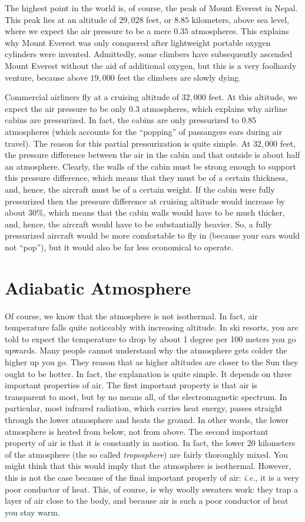The highest point in the world is, of course, the peak of
Mount Everest in Nepal. This peak lies at
an altitude of $29,028$ feet, or $8.85$ kilometers, above sea level,
where we expect the air pressure to
be a mere  $0.35$ atmospheres. This explains why Mount Everest was only conquered
after lightweight portable oxygen cylinders were  invented. Admittedly, 
some climbers have subsequently ascended Mount Everest without the aid of 
additional oxygen, 
but this is a very foolhardy venture, because 
 above $19,000$ feet the climbers are slowly dying.

Commercial airliners fly at a cruising altitude of $32,000$ feet. At
this altitude, we expect the air pressure to be only $0.3$ atmospheres,
which explains
why airline cabins are pressurized. In fact, the cabins are only pressurized to
$0.85$ atmospheres (which  accounts for the ``popping'' of passangers
ears during
air travel). The reason for this partial pressurization is quite simple. At 
$32,000$ feet, the pressure difference between the air in the cabin and that
outside  is
about half an atmosphere. Clearly, the walls of the cabin  must be strong enough
to support this pressure difference, which means that they must be of a
certain thickness, and, hence, the aircraft must be of a certain weight. If
the cabin were fully pressurized then the pressure difference at cruising altitude
would increase by about 30\%, which  means that the cabin walls would
have to be much thicker, and, hence, the aircraft would have to be
substantially  heavier. So, a fully pressurized
aircraft would be more comfortable to fly in (because your ears would not ``pop''),
but it would also be far less economical to operate.

\section{Adiabatic Atmosphere}
Of course, we know that the atmosphere is not isothermal. In fact,  air
temperature falls quite noticeably with 
increasing altitude. In ski resorts,  you are told to
expect the temperature to drop by about 1 degree per 100 meters you go upwards.
 Many people cannot understand
why the atmosphere gets colder the higher up  you go.  They reason that as higher altitudes
are closer to the Sun they ought to be hotter. 
In fact, the explanation is quite
simple. It depends on three important properties of air. The first important 
property  is that air  is transparent to most, but by no means all, of the
electromagnetic spectrum. In particular, most infrared radiation, which carries heat
energy, passes straight through the lower atmosphere and heats the ground. In other
words, the lower atmosphere is heated from below, not from above. The 
second important
property of air is that it is constantly in motion. In fact, the lower 20 kilometers
of the atmosphere (the so called {\em troposphere}) 
are fairly thoroughly mixed. You might think that this 
would imply that the atmosphere is
 isothermal. However, this is not the case because of
the final important properly of air: {\em i.e.}, it is a very poor conductor of heat.
This, of course, is  why woolly sweaters work: they trap a layer of air close to
the body, and because air is such a poor conductor of heat you stay warm.

